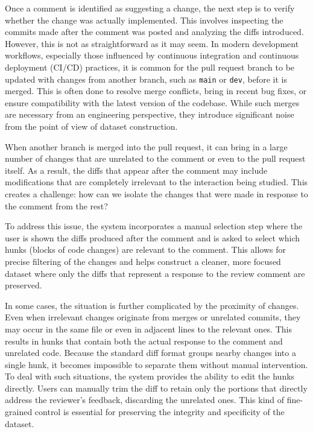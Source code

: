 Once a comment is identified as suggesting a change, the next step is to verify whether the change
was actually implemented. This involves inspecting the commits made after the comment was posted and
analyzing the diffs introduced. However, this is not as straightforward as it may seem. In modern
development workflows, especially those influenced by continuous integration and continuous
deployment (CI/CD) practices, it is common for the pull request branch to be updated with changes
from another branch, such as \texttt{main} or \texttt{dev}, before it is merged. This is often done
to resolve merge conflicts, bring in recent bug fixes, or ensure compatibility with the latest
version of the codebase. While such merges are necessary from an engineering perspective, they
introduce significant noise from the point of view of dataset construction.

When another branch is merged into the pull request, it can bring in a large number of changes that
are unrelated to the comment or even to the pull request itself. As a result, the diffs that appear
after the comment may include modifications that are completely irrelevant to the interaction being
studied. This creates a challenge: how can we isolate the changes that were made in response to the
comment from the rest?

To address this issue, the system incorporates a manual selection step where the user is shown the
diffs produced after the comment and is asked to select which hunks (blocks of code changes) are
relevant to the comment. This allows for precise filtering of the changes and helps construct a
cleaner, more focused dataset where only the diffs that represent a response to the review comment
are preserved.

In some cases, the situation is further complicated by the proximity of changes. Even when
irrelevant changes originate from merges or unrelated commits, they may occur in the same file or
even in adjacent lines to the relevant ones. This results in hunks that contain both the actual
response to the comment and unrelated code. Because the standard diff format groups nearby changes
into a single hunk, it becomes impossible to separate them without manual intervention. To deal with
such situations, the system provides the ability to edit the hunks directly. Users can manually trim
the diff to retain only the portions that directly address the reviewer’s feedback, discarding the
unrelated ones. This kind of fine-grained control is essential for preserving the integrity and
specificity of the dataset.

